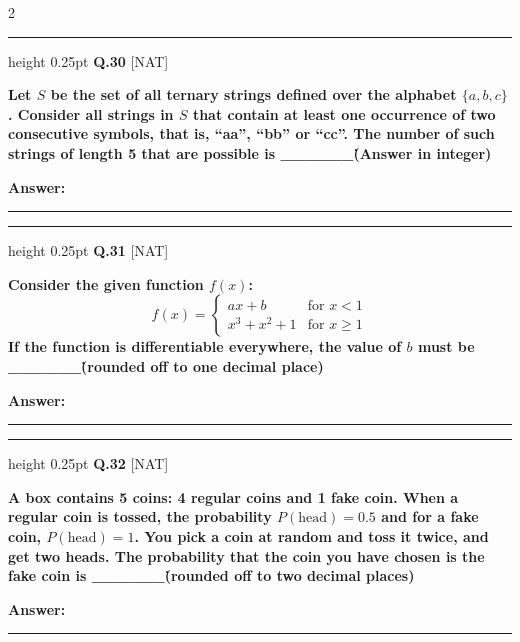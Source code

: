 \documentclass[a4paper,10pt,twoside]{article}
\begin{document}
\begin{multicols}{2}
\par\vspace{6pt}\hrule height 0.25pt\vspace{6pt}
\noindent\textbf{Q.30} \hfill {\footnotesize\textsf{[NAT]}}
\par\vspace{2pt}
{\bfseries Let $S$ be the set of all ternary strings defined over the alphabet $\{a, b, c\}$. Consider all strings in $S$ that contain at least one occurrence of two consecutive symbols, that is, ``aa'', ``bb'' or ``cc''. The number of such strings of length 5 that are possible is \_\_\_\_\_\_\. (Answer in integer) \par}
\par\vspace{3pt}\noindent\textbf{Answer:} \rule{3.2cm}{0.4pt}
\par\vspace{6pt}\hrule height 0.25pt\vspace{6pt}
\noindent\textbf{Q.31} \hfill {\footnotesize\textsf{[NAT]}}
\par\vspace{2pt}
{\bfseries Consider the given function $f(x)$:
\[ f(x) = \begin{cases} ax + b & \text{for } x < 1 \\ x^3 + x^2 + 1 & \text{for } x \ge 1 \end{cases} \]
If the function is differentiable everywhere, the value of $b$ must be \_\_\_\_\_\_\. (rounded off to one decimal place) \par}
\par\vspace{3pt}\noindent\textbf{Answer:} \rule{3.2cm}{0.4pt}
\par\vspace{6pt}\hrule height 0.25pt\vspace{6pt}
\noindent\textbf{Q.32} \hfill {\footnotesize\textsf{[NAT]}}
\par\vspace{2pt}
{\bfseries A box contains 5 coins: 4 regular coins and 1 fake coin. When a regular coin is tossed, the probability $P(\text{head}) = 0.5$ and for a fake coin, $P(\text{head}) = 1$. You pick a coin at random and toss it twice, and get two heads. The probability that the coin you have chosen is the fake coin is \_\_\_\_\_\_\. (rounded off to two decimal places) \par}
\par\vspace{3pt}\noindent\textbf{Answer:} \rule{3.2cm}{0.4pt}

\end{multicols}
\end{document}
